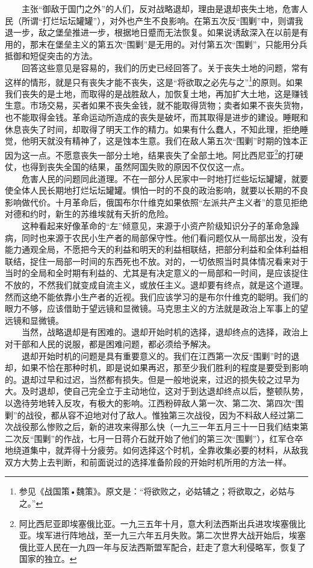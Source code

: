 \documentclass[cn,11pt,chinese]{elegantbook}
\begin{document}
　　主张“御敌于国门之外”的人们，反对战略退却，理由是退却丧失土地，危害人民（所谓“打烂坛坛罐罐”），对外也产生不良影响。在第五次反“围剿”中，则谓我退一步，敌之堡垒推进一步，根据地日蹙而无法恢复。如果说诱敌深入在以前是有用的，那末在堡垒主义的第五次“围剿”是无用的。对付第五次“围剿”，只能用分兵抵御和短促突击的方法。\\
　　回答这些意见是容易的，我们的历史已经回答了。关于丧失土地的问题，常有这样的情形，就是只有丧失才能不丧失，这是“将欲取之必先与之”\footnote[44]{ 参见《战国策•魏策》。原文是：“将欲败之，必姑辅之；将欲取之，必姑与之。”}的原则。如果我们丧失的是土地，而取得的是战胜敌人，加恢复土地，再加扩大土地，这是赚钱生意。市场交易，买者如果不丧失金钱，就不能取得货物；卖者如果不丧失货物，也不能取得金钱。革命运动所造成的丧失是破坏，而其取得是进步的建设。睡眠和休息丧失了时间，却取得了明天工作的精力。如果有什么蠢人，不知此理，拒绝睡觉，他明天就没有精神了，这是蚀本生意。我们在敌人第五次“围剿”时期的蚀本正因为这一点。不愿意丧失一部分土地，结果丧失了全部土地。阿比西尼亚\footnote[45]{ 阿比西尼亚即埃塞俄比亚。一九三五年十月，意大利法西斯出兵进攻埃塞俄比亚。埃军进行阵地战，至一九三六年五月失败。第二次世界大战开始后，埃塞俄比亚人民在一九四一年与反法西斯盟军配合，赶走了意大利侵略军，恢复了国家的独立。}的打硬仗，也得到丧失全国的结果，虽然阿国失败的原因不仅仅这一点。\\
　　危害人民的问题同此道理。不在一部分人民家中一时地打烂些坛坛罐罐，就要使全体人民长期地打烂坛坛罐罐。惧怕一时的不良的政治影响，就要以长期的不良影响做代价。十月革命后，俄国布尔什维克如果依照“左派共产主义者”的意见拒绝对德和约时，新生的苏维埃就有夭折的危险。\\
　　这种看起来好像革命的“左”倾意见，来源于小资产阶级知识分子的革命急躁病，同时也来源于农民小生产者的局部保守性。他们看问题仅从一局部出发，没有能力通观全局，不愿把今天的利益和明天的利益相联结，把部分利益和全体利益相联结，捉住一局部一时间的东西死也不放。对的，一切依照当时具体情况看来对于当时的全局和全时期有利益的、尤其是有决定意义的一局部和一时间，是应该捉住不放的，不然我们就变成自流主义，或放任主义。退却要有终点，就是这个道理。然而这绝不能依靠小生产者的近视。我们应该学习的是布尔什维克的聪明。我们的眼力不够，应该借助于望远镜和显微镜。马克思主义的方法就是政治上军事上的望远镜和显微镜。\\
　　当然，战略退却是有困难的。退却开始时机的选择，退却终点的选择，政治上对干部和人民的说服，都是困难问题，都必须给予解决。\\
　　退却开始时机的问题是具有重要意义的。我们在江西第一次反“围剿”时的退却，如果不恰在那种时机，即是说如果再迟，那至少我们胜利的程度是要受到影响的。退却过早和过迟，当然都有损失。但是一般地说来，过迟的损失较之过早为大。及时退却，使自己完全立于主动地位，这对于到达退却终点以后，整顿队势，以逸待劳地转入反攻，有极大的影响。江西粉碎敌人第一次、第二次、第四次“围剿”的战役，都从容不迫地对付了敌人。惟独第三次战役，因为不料敌人经过第二次战役那么惨败之后，新的进攻来得那么快（一九三一年五月三十一日我们结束第二次反“围剿”的作战，七月一日蒋介石就开始了他们的第三次“围剿”），红军仓卒地绕道集中，就弄得十分疲劳。如何选择这个时机，全靠收集必要的材料，从敌我双方大势上去判断，和前面说过的选择准备阶段的开始时机所用的方法一样。\\
\end{document}
